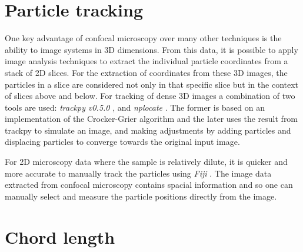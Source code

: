 \section{Particle tracking}
\label{section:expMethods:ParticleTracking}
One key advantage of confocal microscopy over many other techniques is the ability to image systems in 3D dimensions. From this data, it is possible to apply image analysis techniques to extract the individual particle coordinates from a stack of 2D slices. For the extraction of coordinates from these 3D images, the particles in a slice are considered not only in that specific slice but in the context of slices above and below. For tracking of dense 3D images a combination of two tools are used: \textit{trackpy v0.5.0} \cite{allan2021}, and \textit{nplocate} \cite{yang2022}. The former is based on an implementation of the Crocker-Grier algorithm \cite{crocker1996} and the later uses the result from trackpy to simulate an image, and making adjustments by adding particles and displacing particles to converge towards the original input image. 

For 2D microscopy data where the sample is relatively dilute, it is quicker and more accurate to manually track the particles using \textit{Fiji} \cite{schindelin2012}. The image data extracted from confocal microscopy contains spacial information and so one can manually select and measure the particle positions directly from the image.


\section{Chord length}

